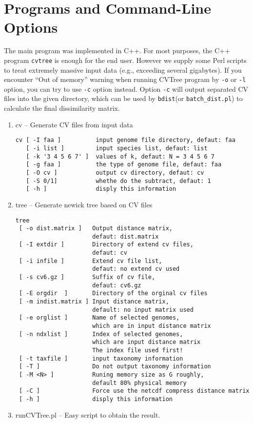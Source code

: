 \documentclass[a4paper,12pt]{article}
\begin{document}
\section{Programs and Command-Line Options}

The main program was implemented in C++. For most purposes, the C++
program \verb!cvtree! is enough for the end user. However we supply some
Perl scripts to treat extremely massive input data (e.g., exceeding
several gigabytes). If you encounter ``Out of memory'' warning when
running CVTree program by \verb!-o! or \verb!-l! option, you can try to
use \verb!-c! option instead. Option \verb!-c! will output separated CV
files into the given directory, which can be used by \verb!bdist!(or
\verb!batch_dist.pl!) to calculate the final dissimilarity matrix.

\begin{enumerate}\itemsep 0pt
  \item cv -- Generate CV files from input data
\begin{verbatim}
cv [ -I faa ]          input genome file directory, defaut: faa
   [ -i list ]         input species list, defaut: list
   [ -k '3 4 5 6 7' ]  values of k, defaut: N = 3 4 5 6 7
   [ -g faa ]          the type of genome file, defaut: faa
   [ -O cv ]           output cv directory, defaut: cv
   [ -S 0/1]           whethe do the subtract, defaut: 1
   [ -h ]              disply this information
\end{verbatim}

  \item tree -- Generate newick tree based on CV files
\begin{verbatim}
tree
 [ -o dist.matrix ]   Output distance matrix, 
                      defaut: dist.matrix
 [ -I extdir ]        Directory of extend cv files, 
                      defaut: cv
 [ -i infile ]        Extend cv file list, 
                      defaut: no extend cv used
 [ -s cv6.gz ]        Suffix of cv file, 
                      defaut: cv6.gz
 [ -E orgdir  ]       Directory of the orginal cv files
 [ -m indist.matrix ] Input distance matrix, 
                      default: no input matrix used
 [ -e orglist ]       Name of selected genomes, 
                      which are in input distance matrix
 [ -n ndxlist ]       Index of selected genomes, 
                      which are input distance matrix
                      The index file used first!
 [ -t taxfile ]       input taxonomy information
 [ -T ]               Do not output taxonomy information
 [ -M <N> ]           Runing memory size as G roughly, 
                      default 80% physical memory
 [ -C ]               Force use the netcdf compress distance matrix
 [ -h ]               disply this information
\end{verbatim}

  \item runCVTree.pl -- Easy script to obtain the result.
\end{enumerate}
\end{document}
